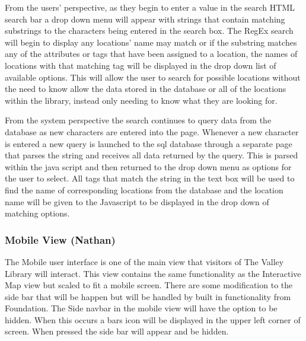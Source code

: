 \documentclass[letterpaper,10pt,titlepage, onecolumn, compsoc]{IEEEtran}
\begin{document}
From the users' perspective, as they begin to enter a value in the search HTML search bar a drop down menu will appear with strings that contain matching substrings to the characters being entered in the search box. The RegEx search will begin to display any locations' name may match or if the substring matches any of the attributes or tags that have been assigned to a location, the names of locations with that matching tag will be displayed in the drop down list of available options. This will allow the user to search for possible locations without the need to know allow the data stored in the database or all of the locations within the library, instead only needing to know what they are looking for.

From the system perspective the search continues to query data from the database as new characters are entered into the page. Whenever a new character is entered a new query is launched to the sql database through a separate page that parses the string and receives all data returned by the query. This is parsed within the java script and then returned to the drop down menu as options for the user to select. All tags that match the string in the text box will be used to find the name of corresponding locations from the database and the location name will be given to the Javascript  to be displayed in the drop down of matching options.

\subsubsection{Mobile View (Nathan)}
The Mobile user interface is one of the main view that visitors of The Valley Library will interact. This view contains the same functionality as the Interactive Map view but scaled to fit a mobile screen. There are some modification to the side bar that will be happen but will be handled by built in functionality from Foundation. The Side navbar in the mobile view will have the option to be hidden. When this occurs a bars icon will be displayed in the upper left corner of screen. When pressed the side bar will appear and be hidden. 
\end{document}
